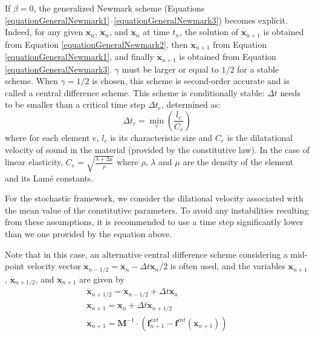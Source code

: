 \documentclass[oneside,11pt,times]{book}
\begin{document}
If $\beta = 0$, the generalized Newmark scheme (Equations \eqref{equationGeneralNewmark1}--\eqref{equationGeneralNewmark3}) becomes explicit. Indeed, for any given $\bm{x}_{n}$, $\dot{\bm{x}}_{n}$, and $\ddot{\bm{x}}_{n}$ at time $t_{n}$, the solution of $\bm{x}_{n+1}$ is obtained from Equation \eqref{equationGeneralNewmark2}, then $\ddot{\bm{x}}_{n+1}$ from Equation \eqref{equationGeneralNewmark1}, and finally $\dot{\bm{x}}_{n+1}$ is obtained from
Equation \eqref{equationGeneralNewmark3}. $\gamma$ must be larger or equal to $1/2$ for a stable scheme. When \hbox{$\gamma = 1/2$} is chosen, this scheme is second-order accurate and is called a central difference scheme. This scheme is conditionally stable: $\Delta t$ needs to be smaller than a critical time step $\Delta t_c$, determined as:
\begin{equation}
  \Delta t_c = \min_e{\left(\frac{l_e}{C_e}\right)}
\end{equation}
where for each element $e$, $l_e$ is its characteristic size and $C_e$ is the dilatational velocity of sound in the material (provided by the constitutive law). In the case of linear elasticity, $C_e=\sqrt{\frac{\lambda+2\mu}{\rho}}$ where $\rho$, $\lambda$ and $\mu$ are the density of the element and its Lam\'e constants.

For the stochastic framework, we consider the dilational velocity associated with the mean value of the constitutive parameters. To avoid any instabilities resulting from these assumptions, it is recommended to use a time step significantly lower than we one provided by the equation above.

Note that in this case, an alternative central difference scheme considering a mid-point velocity vector $\dot{\bm{x}}_{n-1/2} = \dot{\bm{x}}_{n} - \Delta t \ddot{\bm{x}}_{n}/2$ is often used, and the variables $\bm{x}_{n+1}$, $\dot{\bm{x}}_{n+1/2}$, and $\ddot{\bm{x}}_{n+1}$ are given by
%
\begin{eqnarray}
 & \displaystyle{\dot{\bm{x}}_{n+1/2} = \dot{\bm{x}}_{n-1/2} + \Delta t \ddot{\bm{x}}_{n}}  &
   \label{equationCentralDifference13} \\
 & \displaystyle{\bm{x}_{n+1} = \bm{x}_{n} + \Delta t \dot{\bm{x}}_{n+1/2}}  &
   \label{equationCentralDifference2} \\
 & \displaystyle{\ddot{\bm{x}}_{n+1} = \bm{M}^{-1}\cdot \left(\bm{f}^{ext}_{n+1} -
   \bm{f}^{int}(\bm{x}_{n+1})\right)} & \label{equationCentralDifference1}
\end{eqnarray}
%
\end{document}
